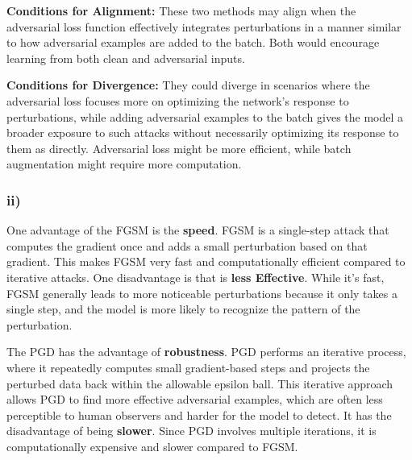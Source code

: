 \documentclass{article}
\begin{document}
\textbf{Conditions for Alignment:} These two methods may align when the adversarial loss function effectively integrates perturbations in a manner similar to how adversarial examples are added to the batch. Both would encourage learning from both clean and adversarial inputs.

\textbf{Conditions for Divergence:} They could diverge in scenarios where the adversarial loss focuses more on optimizing the network’s response to perturbations, while adding adversarial examples to the batch gives the model a broader exposure to such attacks without necessarily optimizing its response to them as directly. Adversarial loss might be more efficient, while batch augmentation might require more computation.

\subsubsection*{ii)}

One advantage of the FGSM is the \textbf{speed}. FGSM is a single-step attack that computes the gradient once and adds a
small perturbation based on that gradient. This makes FGSM very fast and computationally efficient compared to iterative attacks.
One disadvantage is that is \textbf{less Effective}. While it's fast, FGSM generally leads to more noticeable perturbations
because it only takes a single step, and the model is more likely to recognize the pattern of the perturbation.

The PGD has the advantage of \textbf{robustness}. PGD performs an iterative process, where it repeatedly computes small
gradient-based steps and projects the perturbed data back within the allowable epsilon ball. This iterative approach
allows PGD to find more effective adversarial examples, which are often less perceptible to human observers and harder
for the model to detect. It has the disadvantage of being \textbf{slower}. Since PGD involves multiple iterations, it is
computationally expensive and slower compared to FGSM.
\end{document}
